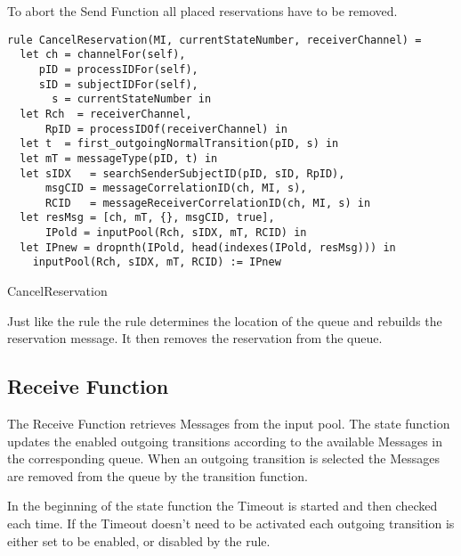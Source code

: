 To abort the Send Function all placed reservations have to be removed.


\begin{listing}[htbp]
\begin{verbatim}
rule CancelReservation(MI, currentStateNumber, receiverChannel) =
  let ch = channelFor(self),
     pID = processIDFor(self),
     sID = subjectIDFor(self),
       s = currentStateNumber in
  let Rch  = receiverChannel,
      RpID = processIDOf(receiverChannel) in
  let t  = first_outgoingNormalTransition(pID, s) in
  let mT = messageType(pID, t) in
  let sIDX   = searchSenderSubjectID(pID, sID, RpID),
      msgCID = messageCorrelationID(ch, MI, s),
      RCID   = messageReceiverCorrelationID(ch, MI, s) in
  let resMsg = [ch, mT, {}, msgCID, true],
      IPold = inputPool(Rch, sIDX, mT, RCID) in
  let IPnew = dropnth(IPold, head(indexes(IPold, resMsg))) in
    inputPool(Rch, sIDX, mT, RCID) := IPnew
\end{verbatim}
\caption{CancelReservation}
\label{lst:shortasm:CancelReservation}
\end{listing}


Just like the  rule the  rule determines the location of the queue and rebuilds the reservation message. It then removes the reservation from the queue.


\subsection{Receive Function}


The Receive Function retrieves Messages from the input pool. The state function updates the enabled outgoing transitions according to the available Messages in the corresponding queue. When an outgoing transition is selected the Messages are removed from the queue by the transition function.


In the beginning of the state function the Timeout is started and then checked each time. If the Timeout doesn't need to be activated each outgoing transition is either set to be enabled, or disabled by the  rule.


